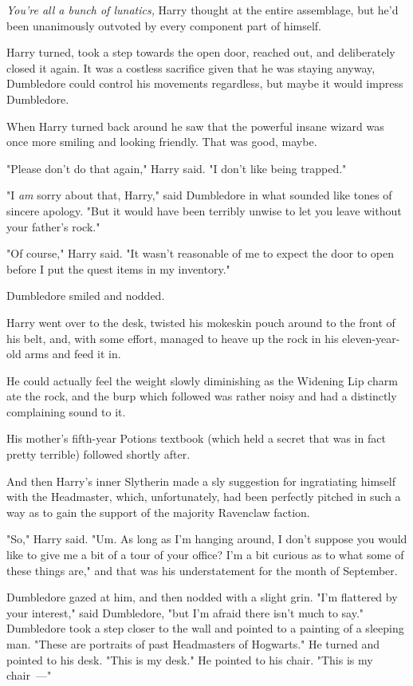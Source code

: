 \emph{You're all a bunch of lunatics,} Harry thought at the entire assemblage,
but he'd been unanimously outvoted by every component part of himself.

Harry turned, took a step towards the open door, reached out, and deliberately
closed it again. It was a costless sacrifice given that he was staying anyway,
Dumbledore could control his movements regardless, but maybe it would impress
Dumbledore.

When Harry turned back around he saw that the powerful insane wizard was once
more smiling and looking friendly. That was good, maybe.

"Please don't do that again," Harry said. "I don't like being trapped."

"I \emph{am} sorry about that, Harry," said Dumbledore in what sounded like
tones of sincere apology. "But it would have been terribly unwise to let you
leave without your father's rock."

"Of course," Harry said. "It wasn't reasonable of me to expect the door to open
before I put the quest items in my inventory."

Dumbledore smiled and nodded.

Harry went over to the desk, twisted his mokeskin pouch around to the front of
his belt, and, with some effort, managed to heave up the rock in his
eleven-year-old arms and feed it in.

He could actually feel the weight slowly diminishing as the Widening Lip charm
ate the rock, and the burp which followed was rather noisy and had a distinctly
complaining sound to it.

His mother's fifth-year Potions textbook (which held a secret that was in fact
pretty terrible) followed shortly after.

And then Harry's inner Slytherin made a sly suggestion for ingratiating himself
with the Headmaster, which, unfortunately, had been perfectly pitched in such a
way as to gain the support of the majority Ravenclaw faction.

"So," Harry said. "Um. As long as I'm hanging around, I don't suppose you would
like to give me a bit of a tour of your office? I'm a bit curious as to what
some of these things are," and that was his understatement for the month of
September.

Dumbledore gazed at him, and then nodded with a slight grin. "I'm flattered by
your interest," said Dumbledore, "but I'm afraid there isn't much to say."
Dumbledore took a step closer to the wall and pointed to a painting of a
sleeping man. "These are portraits of past Headmasters of Hogwarts." He turned
and pointed to his desk. "This is my desk." He pointed to his chair. "This is
my chair~---"

